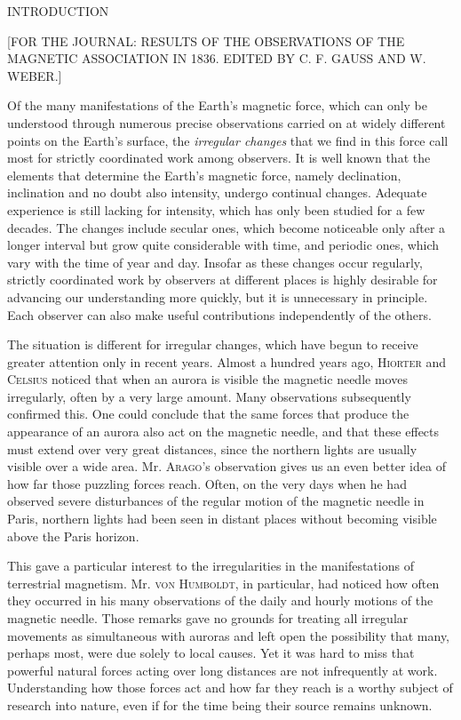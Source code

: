 \clearpage
{}
\begin{center}
{\Large INTRODUCTION}\par\medskip
{\small [FOR THE JOURNAL: RESULTS OF THE OBSERVATIONS OF THE MAGNETIC ASSOCIATION IN 1836. EDITED BY C. F. GAUSS AND W. WEBER.]}
\end{center}
\medskip
Of the many manifestations of the Earth's magnetic force, which can only be understood through numerous precise observations carried on at widely different points on the Earth's surface, the \textit{irregular changes} that we find in this force call most for strictly coordinated work among observers. It is well known that the elements that determine the Earth's magnetic force, namely declination, inclination and no doubt also intensity, undergo continual changes. Adequate experience is still lacking for intensity, which has only been studied for a few decades. The changes include secular ones, which become noticeable only after a longer interval but grow quite considerable with time, and periodic ones, which vary with the time of year and day. Insofar as these changes occur regularly, strictly coordinated work by observers at different places is highly desirable for advancing our understanding more quickly, but it is unnecessary in principle. Each observer can also make useful contributions independently of the others.

The situation is different for irregular changes, which have begun to receive greater attention only in recent years. Almost a hundred years ago, \textsc{Hiorter} and \textsc{Celsius} noticed that when an aurora is visible the magnetic needle moves irregularly, often by a very large amount. Many observations subsequently confirmed this. One could conclude that the same forces that produce the appearance of an aurora also act on the magnetic needle, and that these effects must extend over very great distances, since the northern lights are usually visible over a wide area. Mr. \textsc{Arago}'s observation gives us an even better idea of how far those puzzling forces reach. Often, on the very days when he had observed severe disturbances of the regular motion of the magnetic needle in Paris, northern lights had been seen in distant places without becoming visible above the Paris horizon.

This gave a particular interest to the irregularities in the manifestations of terrestrial magnetism. Mr. \textsc{von Humboldt}, in particular, had noticed how often they occurred in his many observations of the daily and hourly motions of the magnetic needle. Those remarks gave no grounds for treating all irregular movements as simultaneous with auroras and left open the possibility that many, perhaps most, were due solely to local causes. Yet it was hard to miss that powerful natural forces acting over long distances are not infrequently at work. Understanding how those forces act and how far they reach is a worthy subject of research into nature, even if for the time being their source remains unknown.

